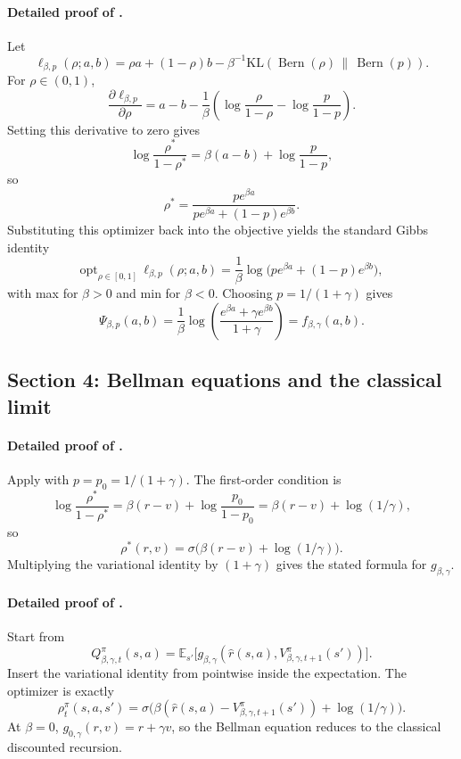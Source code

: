 \documentclass{article}
\theoremstyle{remark}
\DeclareMathOperator{\Bern}{Bern}
\newcommand{\E}{\mathbb{E}}
\newcommand{\KL}{\mathrm{KL}}
\newcommand{\pprior}{p_0}
\begin{document}
\paragraph{Detailed proof of .}
Let
\[
\ell_{\beta,p}(\rho;a,b)=\rho a +(1-\rho)b-\beta^{-1}\KL\!\left(\Bern(\rho)\,\middle\|\,\Bern(p)\right).
\]
For $\rho\in(0,1)$,
\[
\frac{\partial \ell_{\beta,p}}{\partial \rho}
=a-b-\frac{1}{\beta}\left(\log\frac{\rho}{1-\rho}-\log\frac{p}{1-p}\right).
\]
Setting this derivative to zero gives
\[
\log\frac{\rho^*}{1-\rho^*}=\beta(a-b)+\log\frac{p}{1-p},
\]
so
\[
\rho^*=\frac{pe^{\beta a}}{pe^{\beta a}+(1-p)e^{\beta b}}.
\]
Substituting this optimizer back into the objective yields the standard Gibbs identity
\[
\mathrm{opt}_{\rho\in[0,1]}\,\ell_{\beta,p}(\rho;a,b)
=\frac{1}{\beta}\log\bigl(pe^{\beta a}+(1-p)e^{\beta b}\bigr),
\]
with \textnormal{max} for $\beta>0$ and \textnormal{min} for $\beta<0$.
Choosing $p=1/(1+\gamma)$ gives
\[
\Psi_{\beta,p}(a,b)=\frac{1}{\beta}\log\!\left(\frac{e^{\beta a}+\gamma e^{\beta b}}{1+\gamma}\right)=f_{\beta,\gamma}(a,b).
\]

\subsection{Section 4: Bellman equations and the classical limit}
\label{app:bellman}

\paragraph{Detailed proof of .}
Apply  with $p=\pprior=1/(1+\gamma)$.
The first-order condition is
\[
\log\frac{\rho^*}{1-\rho^*}=\beta(r-v)+\log\frac{\pprior}{1-\pprior}=\beta(r-v)+\log(1/\gamma),
\]
so
\[
\rho^*(r,v)=\sigma\!\bigl(\beta(r-v)+\log(1/\gamma)\bigr).
\]
Multiplying the variational identity by $(1+\gamma)$ gives the stated formula for $g_{\beta,\gamma}$.

\paragraph{Detailed proof of .}
Start from
\[
Q_{\beta,\gamma,t}^{\pi}(s,a)=\E_{s'}\bigl[g_{\beta,\gamma}(\hat r(s,a),V_{\beta,\gamma,t+1}^{\pi}(s'))\bigr].
\]
Insert the variational identity from  pointwise inside the expectation.
The optimizer is exactly
\[
\rho_t^{\pi}(s,a,s')=\sigma\!\bigl(\beta(\hat r(s,a)-V_{\beta,\gamma,t+1}^{\pi}(s'))+\log(1/\gamma)\bigr).
\]
At $\beta=0$, $g_{0,\gamma}(r,v)=r+\gamma v$, so the Bellman equation reduces to the classical discounted recursion.
\end{document}
